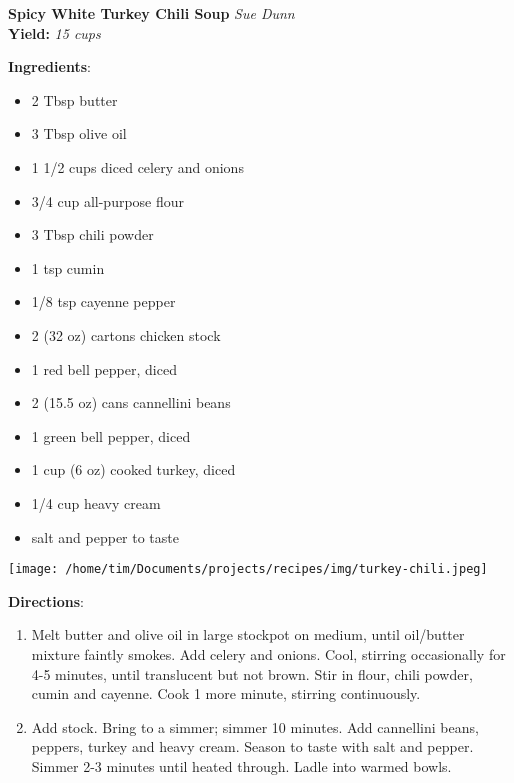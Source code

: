 \documentclass[11pt, twoside, openany]{book}
\begin{document}
\noindent\begin{minipage}[t]{\linewidth}%
{\Large\textbf{Spicy White Turkey Chili Soup}} \label{spicy-white-turkey-chili-soup}\hfill\textit{Sue Dunn}\\
\textbf{Yield:} \textit{15 cups}\\
\noindent\begin{minipage}[t]{0.78\linewidth}%
\textbf{Ingredients}:\vspace{-3mm}
\begin{multicols}{2}
\begin{itemize}\setlength\itemsep{-1mm}
\item 2 Tbsp butter
\item 3 Tbsp olive oil
\item 1 1/2 cups diced celery and onions
\item 3/4 cup all-purpose flour
\item 3 Tbsp chili powder
\item 1 tsp cumin
\item 1/8 tsp cayenne pepper
\item 2 (32 oz) cartons chicken stock
\item 1 red bell pepper, diced
\item 2 (15.5 oz) cans cannellini beans
\item 1 green bell pepper, diced
\item 1 cup (6 oz) cooked turkey, diced
\item 1/4 cup heavy cream
\item salt and pepper to taste
\end{itemize}
\end{multicols}
\end{minipage}
\noindent\begin{minipage}[t]{0.18\linewidth}
\centering \strut\vspace*{-\baselineskip}\newline
\texttt{[image: /home/tim/Documents/projects/recipes/img/turkey-chili.jpeg]}\\
\end{minipage}\vspace{3mm}
\textbf{Directions}:
\vspace{-3mm}\begin{enumerate}\setlength\itemsep{-1mm}
\item Melt butter and olive oil in large stockpot on medium, until oil/butter mixture faintly smokes. Add celery and onions. Cool, stirring occasionally for 4-5 minutes, until translucent but not brown. Stir in flour, chili powder, cumin and cayenne. Cook 1 more minute, stirring continuously.
\item Add stock. Bring to a simmer; simmer 10 minutes. Add cannellini beans, peppers, turkey and heavy cream. Season to taste with salt and pepper. Simmer 2-3 minutes until heated through. Ladle into warmed bowls.
\end{enumerate}
\end{minipage}\vspace{8mm}
\end{document}
